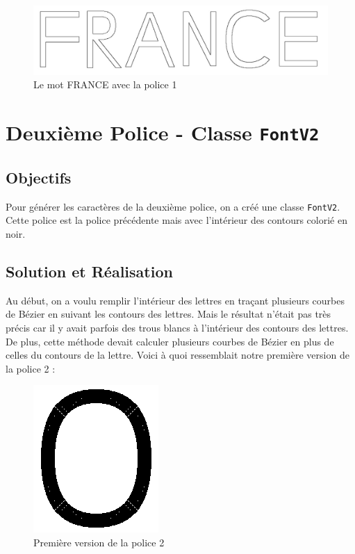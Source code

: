 \documentclass[a4paper, 12pt]{article}
\begin{document}
\begin{figure}[h]
\centering
\includegraphics[scale=0.5]{Images/FRANCE_FontV1.jpeg}
\caption{Le mot FRANCE avec la police 1}
\label{fig2}
\end{figure}

\newpage
\section{Deuxième Police - Classe \texttt{FontV2}}	
\subsection{Objectifs	}
Pour générer les caractères de la deuxième police, on a créé une classe \texttt{FontV2}. Cette police est la police précédente mais avec l'intérieur des contours colorié en noir.

\subsection{Solution et Réalisation}
Au début, on a voulu remplir l'intérieur des lettres en traçant plusieurs courbes de Bézier en suivant les contours des lettres. Mais le résultat n'était pas très précis car il y avait parfois des trous blancs à l'intérieur des contours des lettres. De plus, cette méthode devait calculer plusieurs courbes de Bézier en plus de celles du contours de la lettre. Voici à quoi ressemblait notre première version de la police 2 : 

\begin{figure}[h]
\centering
\includegraphics[scale=0.9]{Images/FontV2_O_Old.png}
\caption{Première version de la police 2}
\label{fig3}
\end{figure}
\end{document}
